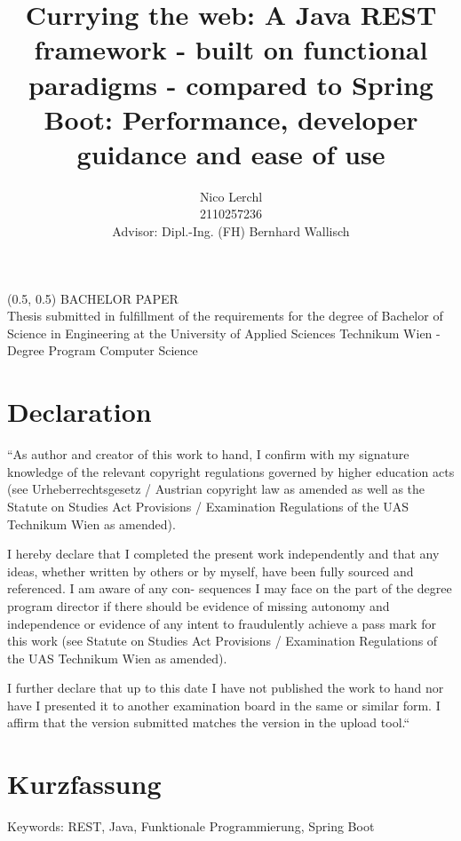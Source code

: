 \documentclass[a4paper,titlepage]{article}
\title{
	Currying the web: A Java REST framework - built on functional paradigms
	- compared to Spring Boot: Performance, developer guidance and ease of use
}
\author{Nico Lerchl\\2110257236\\[0.5cm]{\small Advisor: Dipl.-Ing. (FH) Bernhard Wallisch}}
\begin{document}
\begin{textblock}{15}(0.5, 0.5)
	\noindent\Large BACHELOR PAPER\\
	\large Thesis submitted in fulfillment of the requirements for the degree of Bachelor
	of Science in Engineering at the University of Applied Sciences Technikum Wien
	- Degree Program Computer Science
\end{textblock}

\maketitle

\newpage

\section*{Declaration}
“As author and creator of this work to hand, I confirm with my signature knowledge of the relevant
copyright regulations governed by higher education acts (see Urheberrechtsgesetz / Austrian
copyright law as amended as well as the Statute on Studies Act Provisions / Examination
Regulations of the UAS Technikum Wien as amended).\newline

\noindent I hereby declare that I completed the present work independently and that any ideas, whether
written by others or by myself, have been fully sourced and referenced. I am aware of any con-
sequences I may face on the part of the degree program director if there should be evidence of
missing autonomy and independence or evidence of any intent to fraudulently achieve a pass
mark for this work (see Statute on Studies Act Provisions / Examination Regulations of the UAS
Technikum Wien as amended).\newline

\noindent I further declare that up to this date I have not published the work to hand nor have I presented
it to another examination board in the same or similar form. I affirm that the version submitted
matches the version in the upload tool.“


\newpage
\section*{Kurzfassung}
\blindtext
\newline

\noindent Keywords: REST, Java, Funktionale Programmierung, Spring Boot
\end{document}
